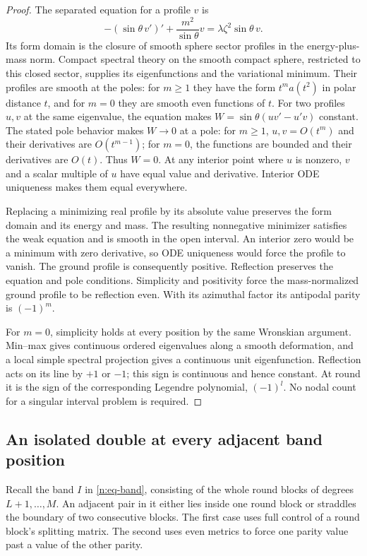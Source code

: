 \begin{proof}
The separated equation for a profile $v$ is
\[
 -(\sin\theta\,v')'+\frac{m^2}{\sin\theta}v
   =\lambda\zeta^2\sin\theta\,v.
\]
Its form domain is the closure of smooth sphere sector profiles in the
energy-plus-mass norm. Compact spectral theory on the smooth compact
sphere, restricted to this closed sector, supplies its eigenfunctions
and the variational minimum. Their profiles are smooth at the poles:
for $m\geq1$ they have the form $t^m a(t^2)$ in polar distance $t$,
and for $m=0$ they are smooth even functions of $t$.
For two profiles $u,v$ at the same eigenvalue, the equation makes
$W=\sin\theta(uv'-u'v)$ constant. The stated pole behavior makes
$W\to0$ at a pole: for $m\geq1$, $u,v=O(t^m)$ and their derivatives
are $O(t^{m-1})$; for $m=0$, the functions are bounded and their
derivatives are $O(t)$. Thus $W=0$. At any interior point where $u$
is nonzero, $v$ and a scalar multiple of $u$ have equal value and
derivative. Interior ODE uniqueness makes them equal everywhere.

Replacing a minimizing real profile by its absolute value preserves the
form domain and its energy and mass. The resulting nonnegative minimizer
satisfies the weak equation and is smooth in the open interval. An
interior zero would be a minimum with zero derivative, so ODE uniqueness
would force the profile to vanish. The ground profile is consequently
positive. Reflection preserves the equation and pole conditions. Simplicity
and positivity force the mass-normalized ground profile to be reflection
even. With its azimuthal factor its antipodal parity is $(-1)^m$.

For $m=0$, simplicity holds at every position by the same Wronskian
argument. Min--max gives continuous ordered eigenvalues along a smooth
deformation, and a local simple spectral projection gives a continuous
unit eigenfunction. Reflection acts on its line by $+1$ or $-1$; this
sign is continuous and hence constant. At round it is the sign of the
corresponding Legendre polynomial, $(-1)^l$. No nodal count for a
singular interval problem is required.
\end{proof}

\subsection{An isolated double at every adjacent band position}

Recall the band \(I\) in \eqref{n:eq-band}, consisting of the whole
round blocks of degrees \(L+1,\ldots,M\).  An adjacent pair in it
either lies inside one round block or straddles the boundary of two
consecutive blocks.
The first case uses full control of a round block's splitting matrix.
The second uses even metrics to force one parity value past a value
of the other parity.

